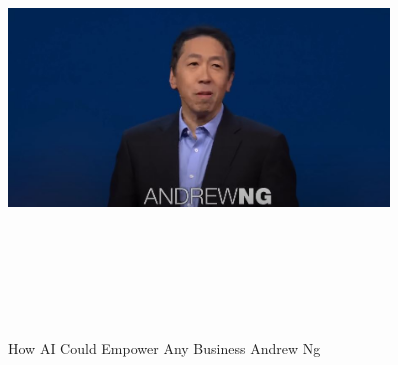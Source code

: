 \documentclass[a4paper,12pt]{article}
\begin{document}
\newpage
\vspace*{1cm} %
\begin{figure}[h]
	\centering
	\vspace{-10pt} %
	\includegraphics[width=0.9\textwidth, height=12cm, keepaspectratio]{../Talks Blogs/How AI Could Empower Any Business - Andrew Ng - TED}
	\vspace{-5pt} %
	\caption{How AI Could Empower Any Business Andrew Ng}
	\vspace{-10pt}
\end{figure}
\end{document}
